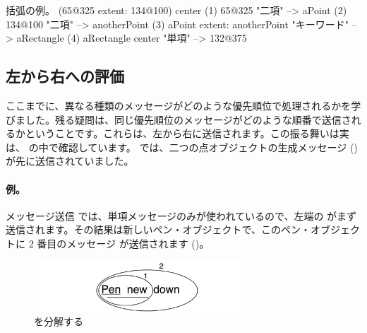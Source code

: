 \documentclass[a4paper,10pt,twoside]{book}
\begin{document}
\begin{example}[decExtent]{括弧の例。}{}
      (65@325 extent: 134@100) center
(1)   65@325                                                    "二項"
    --> aPoint
(2)                                134@100                     "二項"
                                 --> anotherPoint
(3)   aPoint extent: anotherPoint                       "キーワード"
      --> aRectangle
(4)   aRectangle center                                     "単項"
      --> 132@375
\end{example}

\subsection{左から右への評価}
ここまでに、異なる種類のメッセージがどのような優先順位で処理されるかを学びました。残る疑問は、同じ優先順位のメッセージがどのような順番で送信されるかということです。これらは、左から右に送信されます。この振る舞いは実は、 の中で確認しています。 では、二つの点オブジェクトの生成メッセージ () が先に送信されていました。



\paragraph{例。} メッセージ送信  では、単項メッセージのみが使われているので、左端の  がまず送信されます。その結果は新しいペン・オブジェクトで、このペン・オブジェクトに 2 番目のメッセージ  が送信されます ()。

\begin{figure}
	\centering
	\includegraphics[width=8cm]{ucompoUn}
	\caption{ を分解する}
\end{figure}
\end{document}

